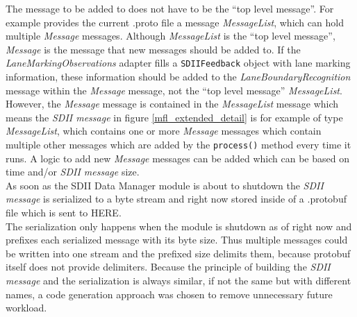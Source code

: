 The message to be added to does not have to be the \enquote{top level message}. For example provides the current .proto file a message \emph{MessageList}, which can hold multiple \emph{Message} messages. Although \emph{MessageList} is the \enquote{top level message}, \emph{Message} is the message that new messages should be added to. If the \emph{LaneMarkingObservations} adapter fills a \verb|SDIIFeedback| object with lane marking information, these information should be added to the \emph{LaneBoundaryRecognition} message within the \emph{Message} message, not the \enquote{top level message} \emph{MessageList}. However, the \emph{Message} message is contained in the \emph{MessageList} message which means the \emph{SDII message} in figure \ref{mfl_extended_detail} is for example of type \emph{MessageList}, which contains one or more \emph{Message} messages which contain multiple other messages which are added by the \verb|process()| method every time it runs. A logic to add new \emph{Message} messages can be added which can be based on time and/or \emph{SDII message} size.\\
As soon as the SDII Data Manager module is about to shutdown the \emph{SDII message} is serialized to a byte stream and right now stored inside of a .protobuf file which is sent to HERE.\\
The serialization only happens when the module is shutdown as of right now and prefixes each serialized message with its byte size.\cite{pb_techniques} Thus multiple messages could be written into one stream and the prefixed size delimits them, because protobuf itself does not provide delimiters.
Because the principle of building the \emph{SDII message} and the serialization is always similar, if not the same but with different names, a code generation approach was chosen to remove unnecessary future workload.

